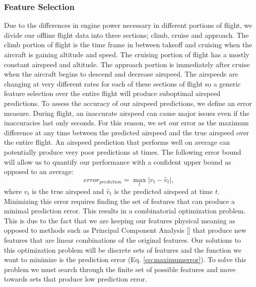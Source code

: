 \documentclass[]{aiaa-tc}
\begin{document}
\subsubsection{Feature Selection}
\label{sec:featureselection}


Due to the differences in engine power necessary in different portions of flight, we divide our offline flight data into three sections; climb, cruise and approach. The climb portion of flight is the time frame in between takeoff and cruising when the aircraft is gaining altitude and speed. The cruising portion of flight has a mostly constant airspeed and altitude. The approach portion is immediately after cruise when the aircraft begins to descend and decrease airspeed. The airspeeds are changing at very different rates for each of these sections of flight so a generic feature selection over the entire flight will produce suboptimal airspeed predictions. To assess the accuracy of our airspeed predictions, we define an error measure. During flight, an inaccurate airspeed can cause major issues even if the inaccuracies last only seconds. For this reason, we set our error as the maximum difference at any time between the predicted airspeed and the true airspeed over the entire flight. An airspeed prediction that performs well on average can potentially produce very poor predictions at times. The following error bound will allow us to quantify our performance with a confident upper bound as opposed to an average:
\begin{equation}
\label{eq:maximumerror}
error_{prediction} = \max_{t} |{v_t - \hat{v}_t}|,
\end{equation}
where $v_t$ is the true airspeed and $\hat{v}_t$ is the predicted airspeed at time $t$. Minimizing this error requires finding the set of features that can produce a minimal prediction error. This results in a combinatorial optimization problem. This is due to the fact that we are keeping our features physical meaning as opposed to methods such as Principal Component Analysis [] that produce new features that are linear combinations of the original features. Our solutions to this optimization problem will be discrete sets of features and the function we want to minimize is the prediction error (Eq. \ref{eq:maximumerror}). To solve this problem we must search through the finite set of possible features and move towards sets that produce low prediction error. 
\end{document}
